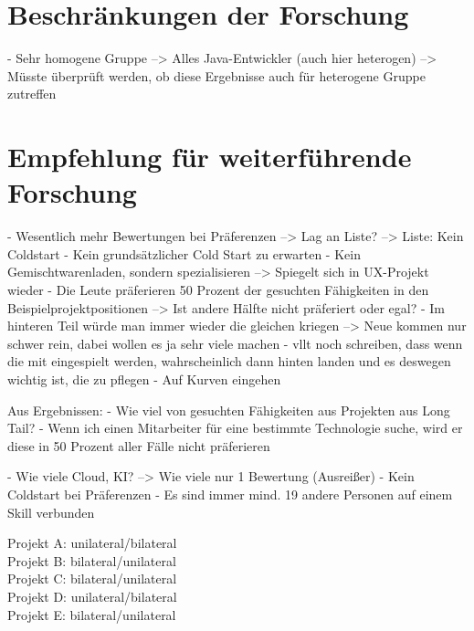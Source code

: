 \section{Beschränkungen der Forschung}
\label{ch:diskussion:beschraenkungen}
- Sehr homogene Gruppe --> Alles Java-Entwickler (auch hier heterogen) --> Müsste überprüft werden, ob diese Ergebnisse auch für heterogene Gruppe zutreffen

\section{Empfehlung für weiterführende Forschung}
\label{ch:diskussion:empfehlungen}
- Wesentlich mehr Bewertungen bei Präferenzen --> Lag an Liste? --> Liste: Kein Coldstart
- Kein grundsätzlicher Cold Start zu erwarten
- Kein Gemischtwarenladen, sondern spezialisieren --> Spiegelt sich in UX-Projekt wieder
- Die Leute präferieren 50 Prozent der gesuchten Fähigkeiten in den Beispielprojektpositionen --> Ist andere Hälfte nicht präferiert oder egal?
- Im hinteren Teil würde man immer wieder die gleichen kriegen --> Neue kommen nur schwer rein, dabei wollen es ja sehr viele machen
- vllt noch schreiben, dass wenn die mit eingespielt werden, wahrscheinlich dann hinten landen und es deswegen wichtig ist, die zu pflegen
- Auf Kurven eingehen

Aus Ergebnissen:
- Wie viel von gesuchten Fähigkeiten aus Projekten aus Long Tail?
- Wenn ich einen Mitarbeiter für eine bestimmte Technologie suche, wird er diese in 50 Prozent aller Fälle nicht präferieren

- Wie viele Cloud, KI? --> Wie viele nur 1 Bewertung (Ausreißer)
- Kein Coldstart bei Präferenzen
- Es sind immer mind. 19 andere Personen auf einem Skill verbunden

Projekt A: unilateral/bilateral\\
Projekt B: bilateral/unilateral\\
Projekt C: bilateral/unilateral\\
Projekt D: unilateral/bilateral\\
Projekt E: bilateral/unilateral



